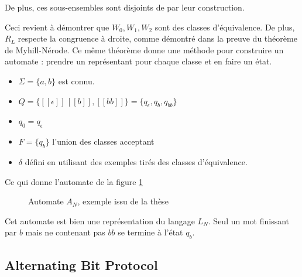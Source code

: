 De plus, ces sous-ensembles sont disjoints de par leur construction.

Ceci revient à démontrer que $W_0,W_1,W_2$ sont des classes d'équivalence. De plus, $R_L$ respecte la congruence à droite, comme démontré dans la preuve du théorème de Myhill-Nérode. Ce même théorème donne une méthode pour construire un automate : prendre un représentant pour chaque classe et en faire un état.

\begin{itemize}
 \item $\Sigma=\{a,b\}$ est connu.
 \item $Q=\{[[\epsilon]]\, [[b]], [[bb]]\} = \{q_\epsilon, q_b, q_{bb}\}$
 \item $q_0 = q_\epsilon$
 \item $F = \{q_b\}$ l'union des classes acceptant
 \item $\delta$ défini en utilisant des exemples tirés des classes d'équivalence.
\end{itemize}

Ce qui donne l'automate de la figure \ref{fig:an}

\begin{figure}[H]
 \centering
 \caption{Automate $A_N$, exemple issu de la thèse\cite{Neider14}}\label{fig:an}
\end{figure}

Cet automate est bien une représentation du langage $L_N$. Seul un mot finissant par $b$ mais ne contenant pas $bb$ se termine à l'état $q_b$.




  \subsection{Alternating Bit Protocol}\label{ss:abp}

